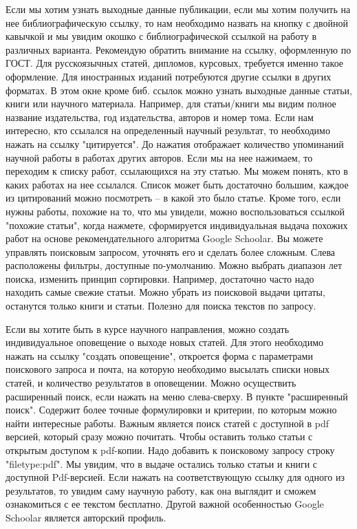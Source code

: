 \documentclass{report}
\begin{document}
Если мы хотим узнать выходные данные публикации, если мы хотим получить на нее библиографическую ссылку, то нам необходимо назвать на кнопку с двойной кавычкой и мы увидим окошко с библиографической ссылкой на работу в различных варианта. Рекомендую обратить внимание на ссылку, оформленную по ГОСТ. Для русскоязычных статей, дипломов, курсовых, требуется именно такое оформление. Для иностранных изданий потребуются другие ссылки в других форматах. В этом окне кроме биб. ссылок можно узнать выходные данные статьи, книги или научного материала. Например, для статьи/книги мы видим полное название издательства, год издательства, авторов и номер тома. Если нам интересно, кто ссылался на определенный научный результат, то необходимо нажать на ссылку "цитируется". До нажатия отображает количество упоминаний научной работы в работах других авторов. Если мы на нее нажимаем, то переходим к списку работ, ссылающихся на эту статью. Мы можем понять, кто в каких работах на нее ссылался. Список может быть достаточно большим, каждое из цитирований можно посмотреть -- в какой это было статье. Кроме того, если нужны работы, похожие на то, что мы увидели, можно воспользоваться ссылкой "похожие статьи", когда нажмете, сформируется индивидуальная выдача похожих работ на основе рекомендательного алгоритма Google Schoolar. Вы можете управлять поисковым запросом, уточнять его и сделать более сложным. Слева расположены фильтры, доступные по-умолчанию. Можно выбрать диапазон лет поиска, изменить принцип сортировки. Например, достаточно часто надо находить самые свежие статьи. Можно убрать из поисковой выдачи цитаты, останутся только книги и статьи. Полезно для поиска текстов по запросу.

Если вы хотите быть в курсе научного направления, можно создать индивидуальное оповещение о выходе новых статей. Для этого необходимо нажать на ссылку "создать оповещение", откроется форма с параметрами поискового запроса и почта, на которую необходимо высылать списки новых статей, и количество результатов в оповещении. Можно осуществить расширенный поиск, если нажать на меню слева-сверху. В пункте "расширенный поиск". Содержит более точные формулировки и критерии, по которым можно найти интересные работы. Важным является поиск статей с доступной в pdf версией, который сразу можно почитать. Чтобы оставить только статьи с открытым доступом к pdf-копии. Надо добавить к поисковому запросу строку "filetype:pdf". Мы увидим, что в выдаче остались только статьи и книги с доступной Pdf-версией. Если нажать на соответствующую ссылку для одного из результатов, то увидим саму научную работу, как она выглядит и сможем ознакомиться с ее текстом бесплатно. 
Другой важной особенностью Google Schoolar является авторский профиль. 
\end{document}
